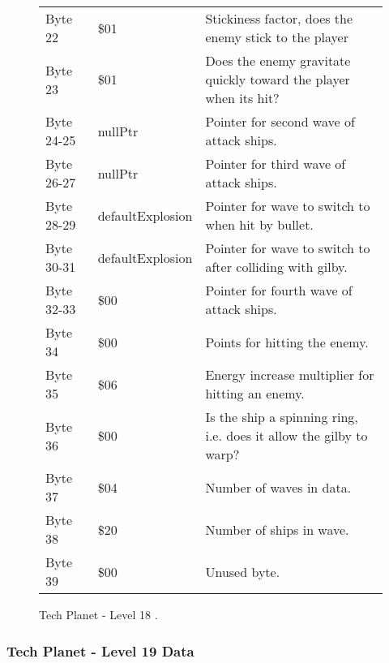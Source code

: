 \begin{figure}[H]
{\begin{adjustbox}{width=12cm}
\begin{tabular}{lll}
 Byte 22    & \$01                        & Stickiness factor, does the enemy stick to the player               \\
 Byte 23    & \$01                        & Does the enemy gravitate quickly toward the player when its hit?    \\
 Byte 24-25 & nullPtr                    & Pointer for second wave of attack ships.                            \\
 Byte 26-27 & nullPtr                    & Pointer for third wave of attack ships.                             \\
 Byte 28-29 & defaultExplosion           & Pointer for wave to switch to when hit by bullet.                   \\
 Byte 30-31 & defaultExplosion           & Pointer for  wave to switch to after colliding with gilby.          \\
 Byte 32-33 & \$00                        & Pointer for fourth wave of attack ships.                            \\
 Byte 34    & \$00                        & Points for hitting the enemy.                                       \\
 Byte 35    & \$06                        & Energy increase multiplier for hitting an enemy.                    \\
 Byte 36    & \$00                        & Is the ship a spinning ring, i.e. does it allow the gilby to warp?  \\
 Byte 37    & \$04                        & Number of waves in data.                                            \\
 Byte 38    & \$20                        & Number of ships in wave.                                            \\
 Byte 39    & \$00                        & Unused byte.                                                        \\
\bottomrule
\end{tabular}

  \end{adjustbox}

  }\caption*{Tech Planet - Level 18
.}
\end{figure}

\clearpage
\subsubsection{Tech Planet - Level 19 Data}

